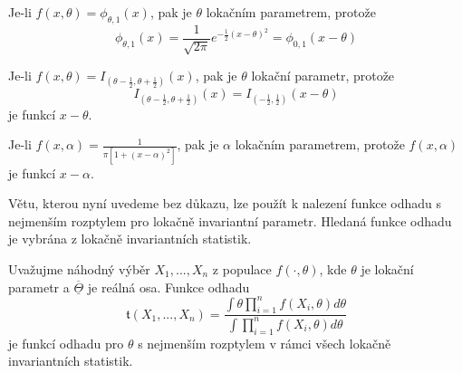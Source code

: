 \begin{example}
Je-li $f(x, \theta) = \phi_{\theta, 1}(x)$, pak je $\theta$ lokačním parametrem, protože
\begin{equation*}
\phi_{\theta, 1}(x) = \frac{1}{\sqrt{2 \pi}} e^{-\frac{1}{2}(x - \theta)^2} = \phi_{0,1}(x - \theta)
\end{equation*}

Je-li $f(x, \theta) = I_{(\theta - \frac{1}{2}, \theta + \frac{1}{2})}(x)$, pak je $\theta$ lokační parametr, protože
\begin{equation*}
I_{(\theta - \frac{1}{2}, \theta + \frac{1}{2})}(x) = I_{(-\frac{1}{2}, \frac{1}{2})}(x - \theta)
\end{equation*}
je funkcí $x - \theta$.

Je-li $f(x, \alpha) = \frac{1}{\pi [1 + (x - \alpha)^2]}$, pak je $\alpha$ lokačním parametrem, protože $f(x, \alpha)$ je funkcí $x - \alpha$.
\end{example}

Větu, kterou nyní uvedeme bez důkazu, lze použít k nalezení funkce odhadu s nejmenším rozptylem pro lokačně invariantní parametr. Hledaná funkce odhadu je vybrána z lokačně invariantních statistik.

\begin{theorem}
Uvažujme náhodný výběr $X_1, ..., X_n$ z populace $f(\cdot, \theta)$, kde $\theta$ je lokační parametr a $\overline{\underline{\Theta}}$ je reálná osa. Funkce odhadu
\begin{equation*}
\mathfrak{t}(X_1, ..., X_n) = \frac{\int \theta \prod_{i = 1}^n f(X_i, \theta)d\theta}{\int \prod_{i = 1}^n f(X_i, \theta)d\theta}
\end{equation*}
je funkcí odhadu pro $\theta$ s nejmenším rozptylem v rámci všech lokačně invariantních statistik.
\end{theorem}

